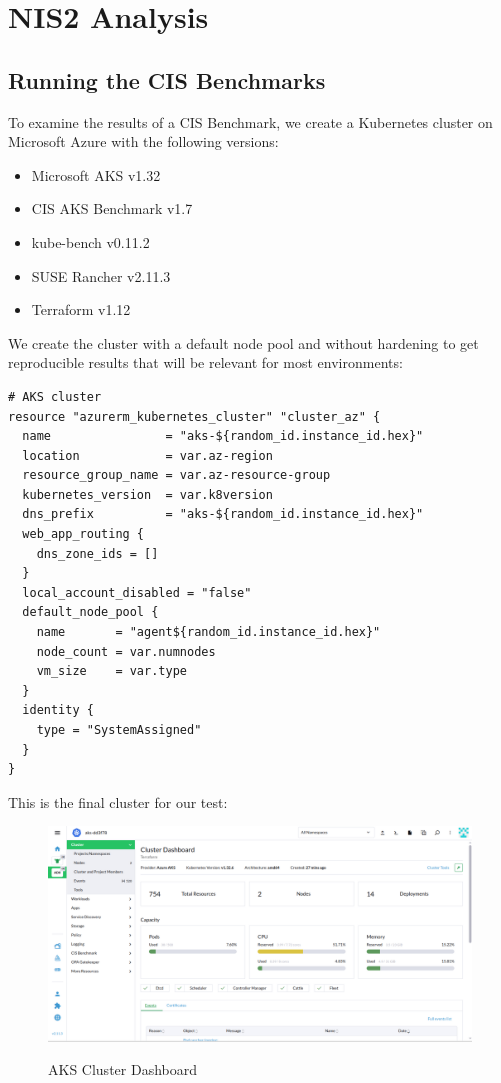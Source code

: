 %
%

\pagebreak
\section{NIS2 Analysis}

\onehalfspacing

\subsection{Running the CIS Benchmarks}

To examine the results of a CIS Benchmark, we create a Kubernetes cluster on Microsoft Azure with the following versions:

\begin{itemize}
    \item Microsoft AKS v1.32
    \item CIS AKS Benchmark v1.7
    \item kube-bench v0.11.2
    \item SUSE Rancher v2.11.3
    \item Terraform v1.12
\end{itemize}

We create the cluster with a default node pool and without hardening to get reproducible results that will be relevant for most environments:

\begin{lstlisting}[caption=Terraform Plan, frame=single, basicstyle=\ttfamily]
# AKS cluster
resource "azurerm_kubernetes_cluster" "cluster_az" {
  name                = "aks-${random_id.instance_id.hex}"
  location            = var.az-region
  resource_group_name = var.az-resource-group
  kubernetes_version  = var.k8version
  dns_prefix          = "aks-${random_id.instance_id.hex}"
  web_app_routing {
    dns_zone_ids = []
  }
  local_account_disabled = "false"
  default_node_pool {
    name       = "agent${random_id.instance_id.hex}"
    node_count = var.numnodes
    vm_size    = var.type
  }
  identity {
    type = "SystemAssigned"
  }
}            
\end{lstlisting}
This is the final cluster for our test:

\begin{figure}[H]
\centering
\caption {AKS Cluster Dashboard}
\includegraphics[width=\linewidth]{images/aks-dd3f78.png}
\label{fig:aksdd3f78}
\end{figure}

